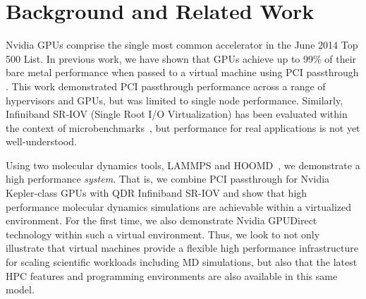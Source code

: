 


 


\section{Background and Related Work}


Nvidia GPUs comprise the single most common accelerator in the June 2014 Top 500 List.  In previous work, we have shown that GPUs achieve up to 99\% of their bare metal performance when passed to a virtual machine using PCI passthrough \cite{Walters2014cloud}.  This work demonstrated PCI passthrough performance across a range of hypervisors and GPUs, but was limited to single node performance.  Similarly, Infiniband SR-IOV (Single Root I/O Virtualization) has been evaluated within the context of microbenchmarks~\cite{SRIOVInfiniband,Musleh2014cloud}, but performance for real applications is not yet well-understood.

Using two molecular dynamics tools, LAMMPS\cite{plimpton2007lammps} and HOOMD~\cite{anderson2010hoomd}, we demonstrate a high performance \textit{system}.  That is, we combine PCI passthrough for Nvidia Kepler-class GPUs with QDR Infiniband SR-IOV and show that high performance molecular dynamics simulations are achievable within a virtualized environment.  For the first time, we also demonstrate Nvidia GPUDirect technology within such a virtual environment.  Thus, we look to not only illustrate that virtual machines provide a flexible high performance infrastructure for scaling scientific workloads including MD simulations, but also that the latest HPC features and programming environments are also available in this same model.  


